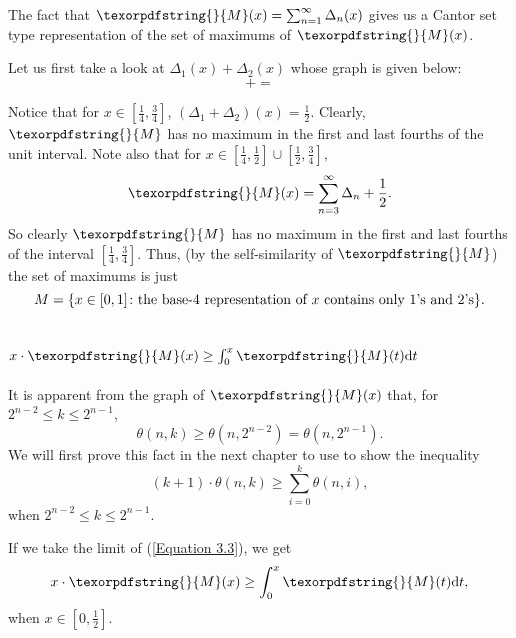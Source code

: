 \documentclass[12pt]{ucthesis}
\theoremstyle{plain}
\theoremstyle{definition}
\newcommand{\takagi}{
  \texorpdfstring{\protect}{M}
}
\begin{document}
The fact that $\takagi(x) = \sum_{n = 1}^\infty \Delta_n(x)$ gives us
a Cantor set type representation of the set of maximums of $\takagi(x)$.

Let us first take a look at $\Delta_1(x) + \Delta_2(x)$ whose graph is given below:
\begin{equation*}
 +
 =

\end{equation*}

Notice that for $x \in [\frac{1}{4}, \frac{3}{4}]$, $(\Delta_1 + \Delta_2)(x) = \frac{1}{2}$.
Clearly, $\takagi$ has no maximum in the first and last fourths of the unit interval.
Note also that for $x \in [\frac{1}{4}, \frac{1}{2}] \cup [\frac{1}{2}, \frac{3}{4}]$,
\begin{equation*}
\takagi(x) = \sum_{n = 3}^\infty \Delta_n + \frac{1}{2}.
\end{equation*}
So clearly $\takagi$ has no maximum in the first and last fourths of the interval
$[\frac{1}{4}, \frac{3}{4}]$.
Thus, (by the self-similarity of $\takagi$) the set of maximums is just
\begin{equation*}
M = \{x \in [0, 1] \colon \textnormal{the base-4 representation of } x \textnormal{ contains only 1's and 2's}\}.
\end{equation*}

\section{
  \texorpdfstring{
    $x \cdot \takagi(x) \ge \int_0^x \takagi(t) \mathrm{d}t$
  }{
    x M(x) >= int\{0\}\{x\} M(t) dt
  }
}
\label{Section 3.4}

It is apparent from the graph of $\takagi(x)$ that, for $2^{n - 2} \le k \le 2^{n - 1}$,
\begin{equation*}
\theta(n, k) \ge \theta(n, 2^{n - 2}) = \theta(n, 2^{n - 1}).
\end{equation*}
We will first prove this fact in the next chapter to use to show the inequality
\begin{equation}
\label{Equation 3.3}
(k + 1) \cdot \theta(n, k) \ge \sum_{i = 0}^k \theta(n, i),
\end{equation}
when $2^{n - 2} \le k \le 2^{n - 1}$.

If we take the limit of (\ref{Equation 3.3}), we get
\begin{equation*}
x \cdot \takagi(x) \ge \int_0^x \takagi(t) \mathrm{d}t,
\end{equation*}
when $x \in [0, \frac{1}{2}]$.
\end{document}
